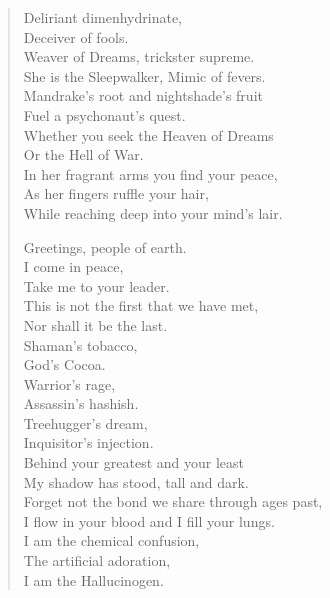 \documentclass[11pt,letterpaper]{article}
\begin{document}
\begin{verse}
Deliriant dimenhydrinate,\\
Deceiver of fools.\\
Weaver of Dreams, trickster supreme.\\
She is the Sleepwalker, Mimic of fevers.\\
Mandrake's root and nightshade's fruit\\
Fuel a psychonaut's quest.\\
Whether you seek the Heaven of Dreams\\
Or the Hell of War.\\
In her fragrant arms you find your peace,\\
As her fingers ruffle your hair,\\
While reaching deep into your mind's lair.

Greetings, people of earth.\\
I come in peace,\\
Take me to your leader.\\
This is not the first that we have met,\\
Nor shall it be the last.\\
Shaman's tobacco,\\
God's Cocoa.\\
Warrior's rage,\\
Assassin's hashish.\\
Treehugger's dream,\\
Inquisitor's injection.\\
Behind your greatest and your least\\
My shadow has stood, tall and dark.\\
Forget not the bond we share through ages past,\\
I flow in your blood and I fill your lungs.\\
I am the chemical confusion,\\
The artificial adoration,\\
I am the Hallucinogen.

\end{verse}

\end{document}
